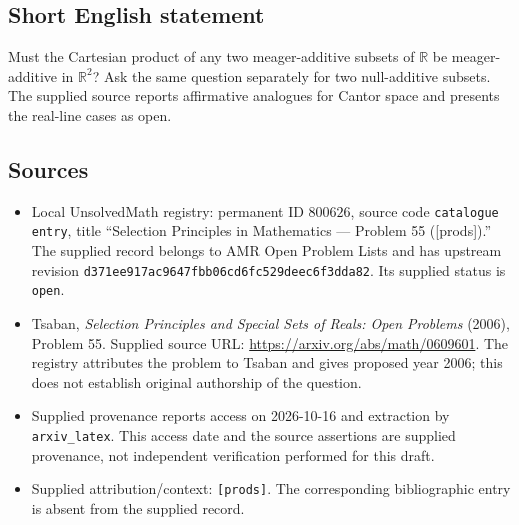 \documentclass[11pt]{article}
\newcommand{\R}{\mathbb{R}}
\begin{document}
\subsection{Short English statement}
Must the Cartesian product of any two meager-additive subsets of \(\R\) be meager-additive in \(\R^2\)? Ask the same question separately for two null-additive subsets. The supplied source reports affirmative analogues for Cantor space and presents the real-line cases as open.
\subsection{Sources}
\begin{itemize}
\item Local UnsolvedMath registry: permanent ID \(800626\), source code \texttt{catalogue entry}, title ``Selection Principles in Mathematics --- Problem 55 ([prods]).'' The supplied record belongs to AMR Open Problem Lists and has upstream revision \texttt{d371ee917ac9647fbb06cd6fc529deec6f3dda82}. Its supplied status is \texttt{open}.
\item Tsaban, \emph{Selection Principles and Special Sets of Reals: Open Problems} (2006), Problem 55. Supplied source URL: \url{https://arxiv.org/abs/math/0609601}. The registry attributes the problem to Tsaban and gives proposed year 2006; this does not establish original authorship of the question.
\item Supplied provenance reports access on 2026-10-16 and extraction by \texttt{arxiv\_latex}. This access date and the source assertions are supplied provenance, not independent verification performed for this draft.
\item Supplied attribution/context: \texttt{[prods]}. The corresponding bibliographic entry is absent from the supplied record.
\end{itemize}
\end{document}
